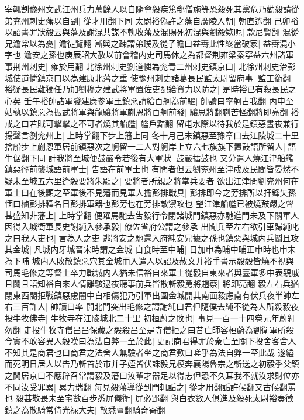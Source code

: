 宰輒割豫州文武江州兵力萬餘人以自隨會毅疾篤郗僧施等恐毅死其黨危乃勸毅請從弟兖州刺史藩以自副|{
	從才用翻下同}
太尉裕偽許之藩自廣陵入朝|{
	朝直遙翻}
己卯裕以詔書罪狀毅云與藩及謝混共謀不軌收藩及混賜死初混與劉毅欵昵|{
	款尼賢翻}
混從兄澹常以為憂|{
	澹徒覽翻}
漸與之疎謂弟璞及從子瞻曰益夀此性終當破家|{
	益夀混小字也}
澹安之孫也庚辰詔大赦以前會稽内史司馬休之為都督荆雍梁秦寜益六州諸軍事荆州刺史|{
	雍於用翻}
北徐州刺史劉道憐為兖青二州刺史鎮京口|{
	北徐州刺史治彭城使道憐鎮京口以為建康北藩之重}
使豫州刺史諸葛長民監太尉留府事|{
	監工銜翻}
裕疑長民難獨任乃加劉穆之建武將軍置佐吏配給資力以防之|{
	是時裕已有殺長民之心矣}
壬午裕帥諸軍發建康參軍王鎮惡請給百舸為前驅|{
	帥讀曰率舸古我翻}
丙申至姑孰以鎮惡為振武將軍與龍驤將軍蒯恩將百舸前發|{
	驤思將翻蒯苦怪翻將即亮翻}
裕戒之曰若賊可擊擊之不可者燒其船艦|{
	艦戶黯翻}
留屯水際以待我於是鎮惡晝夜兼行揚聲言劉兖州上|{
	上時掌翻下步上藩上同}
冬十月己未鎮惡至豫章口去江陵城二十里捨船步上蒯恩軍居前鎮惡次之舸留一二人對舸岸上立六七旗旗下置鼓語所留人|{
	語牛倨翻下同}
計我將至城便鼓嚴令若後有大軍狀|{
	鼓嚴擂鼓也}
又分遣人燒江津船艦鎮惡徑前襲城語前軍士|{
	告語在前軍士也}
有問者但云劉兖州至津戍及民間皆晏然不疑未至城五六里逢毅要將朱顯之|{
	要將者所親之將掌兵要者}
欲出江津問劉兖州何在軍士曰在後顯之至軍後不見藩而見軍人擔彭排戰具|{
	彭排即今之旁排所以扞鋒矢孫愐曰樐彭排釋名日彭排軍器也彭旁也在旁排敵禦攻也}
望江津船艦已被燒鼓嚴之聲甚盛知非藩上|{
	上時掌翻}
便躍馬馳去吿毅行令閉諸城門鎮惡亦馳進門未及下關軍人因得入城衛軍長史謝純入參承毅|{
	僚佐省府公謂之參承}
出聞兵至左右欲引車歸純叱之曰我人吏也|{
	言為人之吏}
逃將安之馳還入府純安兄據之孫也鎮惡與城内兵鬭且攻其金城|{
	凡城内牙城晉宋時謂之金城}
自食時至中晡|{
	日加申為晡中晡正申時也申末為下晡}
城内人敗散鎮惡穴其金城而入遣人以詔及赦文并裕手書示毅毅皆燒不視與司馬毛修之等督士卒力戰城内人猶未信裕自來軍士從毅自東來者與臺軍多中表親戚且鬬且語知裕自來人情離駭逮夜聽事前兵皆散斬毅勇將趙蔡|{
	將即亮翻}
毅左右兵猶閉東西閤拒戰鎮惡慮闇中自相傷犯乃引軍出圍金城開其南面毅慮南有伏兵夜半帥左右三百許人|{
	帥讀曰率}
開北門突出毛修之謂謝純曰君但隨僕去純不從為人所殺毅夜投牛牧佛寺|{
	牛牧寺在江陵城北二十里}
初桓蔚之敗也|{
	事見一百一十四卷元年蔚紆勿翻}
走投牛牧寺僧昌昌保藏之毅殺昌至是寺僧拒之曰昔亡師容桓蔚為劉衛軍所殺今實不敢容異人毅嘆曰為法自弊一至於此|{
	史記商君得罪於秦亡至關下投舍客舍人不知其是商君也曰商君之法舍人無驗者坐之商君歎曰嗟乎為法自弊一至此哉}
遂縊而死明日居人以告乃斬首於市并子姪皆伏誅毅兄模奔襄陽魯宗之斬送之初毅季父鎮之閒居京口不應辟召常謂毅及藩曰汝輩才器足以得志但恐不久耳我不就汝求財位亦不同汝受罪累|{
	累力瑞翻}
每見毅藩導從到門輒詬之|{
	從才用翻詬許候翻又古候翻罵也}
毅甚敬畏未至宅數百步悉屏儀衛|{
	屏必郢翻}
與白衣數人俱進及毅死太尉裕奏徵鎮之為散騎常侍光禄大夫|{
	散悉亶翻騎奇寄翻}
